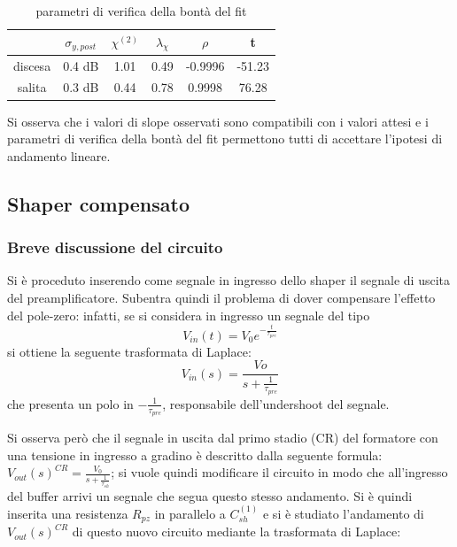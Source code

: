 \documentclass{article}
\begin{document}
\begin{table}[H]
    \centering
    \begin{tabular}{cccccc}
        \toprule
                &$\sigma_{y, post}$    &$\chi^{(2)}$    &$\lambda_{\chi}$   &$\rho$ &t      \\
        \midrule
        discesa &0.4 dB                &1.01            &0.49               &-0.9996&-51.23\\
        salita  &0.3 dB                &0.44            &0.78               &0.9998 &76.28  \\
        \bottomrule
    \end{tabular}
    \caption{parametri di verifica della bontà del fit}
\end{table}

Si osserva che i valori di slope osservati sono compatibili con i valori attesi e i parametri di verifica
della bontà del fit permettono tutti di accettare l'ipotesi di andamento lineare.

\subsection{Shaper compensato}

\subsubsection{Breve discussione del circuito}

Si è proceduto inserendo come segnale in ingresso dello shaper il segnale di uscita del preamplificatore. Subentra quindi il problema 
di dover compensare l'effetto del pole-zero: infatti, se si considera in ingresso un segnale del tipo 
\[V_{in}(t)=V_0 e^{-\frac{t}{\tau_{pre}}}\] 
si ottiene la seguente trasformata di Laplace:
\begin{equation}
    V_{in}(s)=\frac{Vo}{s+\frac{1}{\tau_{pre}}}
\end{equation}
che presenta un polo in $-\frac{1}{\tau_{pre}} $,  responsabile dell’undershoot del segnale.

Si osserva però che il segnale in uscita dal primo stadio (CR) del formatore con una tensione in ingresso a gradino è descritto dalla seguente formula: 
$V_{out}(s)^{CR}=\frac{V_{0}}{s+\frac{1}{\tau_{sh}}}$;
si vuole quindi modificare il circuito in modo che all'ingresso del buffer arrivi un segnale che segua questo stesso andamento.
Si è quindi inserita una resistenza $R_{pz}$ in parallelo a $C_{sh}^{(1)}$ e si è studiato l'andamento di $ V_{out}(s)^{CR}$ di questo nuovo circuito mediante la trasformata di Laplace:
\end{document}
